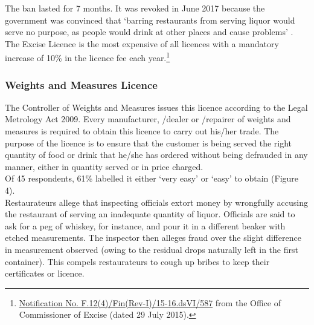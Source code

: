\documentclass[a4paper, 12pt, twoside]{article}
\begin{document}
		The ban lasted for 7 months. It was revoked in June 2017 because the government was convinced that ‘barring restaurants from serving liquor would serve no purpose, as people would drink at other places and cause problems’ \parencite{ie2017delliqlicensebanlifted}. \\
		
		The Excise Licence is the most expensive of all licences with a mandatory increase of 10\% in the licence fee each year.\footnote{\href{https://bit.ly/2xoejoG}{Notification No. F.12(4)/Fin(Rev-I)/15-16.dsVI/587} from the Office of Commissioner of Excise 
(dated 29 July 2015).} 
		
		\subsubsection{Weights and Measures Licence}
		The Controller of Weights and Measures issues this licence according to the Legal Metrology Act 2009. Every manufacturer, /dealer or /repairer of weights and measures is required to obtain this licence to carry out his/her trade. The purpose of the 
licence is to ensure that the customer is being served the right quantity of food or drink that he/she has ordered without being defrauded in any manner, either in quantity served or in price charged.\\
		
		Of 45 respondents, 61\% labelled it either ‘very easy’ or ‘easy’ to obtain (Figure 4). \\%
		
		Restaurateurs allege that inspecting officials extort money by wrongfully accusing the restaurant of serving an inadequate quantity of liquor. Officials are said to ask for a peg of whiskey, for instance, and pour it in a different beaker with etched 
measurements. The inspector then alleges fraud over the slight difference in measurement observed (owing to the residual drops naturally left in the first container). This compels restaurateurs to cough up bribes to keep their certificates or licence.
		
\end{document}
